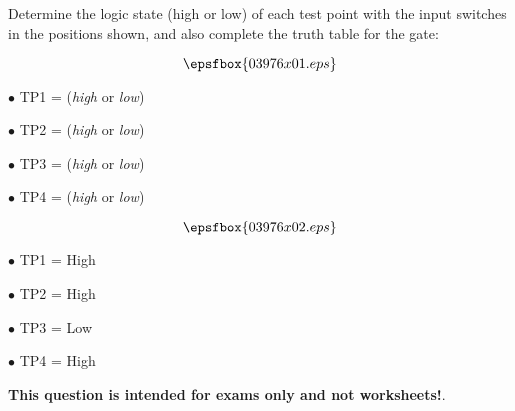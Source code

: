 

Determine the logic state (high or low) of each test point with the input switches in the positions shown, and also complete the truth table for the gate:

$$\epsfbox{03976x01.eps}$$

\medskip
\item{$\bullet$} TP1 = ({\it high} or {\it low}) 
\item{$\bullet$} TP2 = ({\it high} or {\it low}) 
\item{$\bullet$} TP3 = ({\it high} or {\it low}) 
\item{$\bullet$} TP4 = ({\it high} or {\it low}) 
\medskip







$$\epsfbox{03976x02.eps}$$

\medskip
\item{$\bullet$} TP1 = High
\item{$\bullet$} TP2 = High
\item{$\bullet$} TP3 = Low
\item{$\bullet$} TP4 = High
\medskip







{\bf This question is intended for exams only and not worksheets!}.




